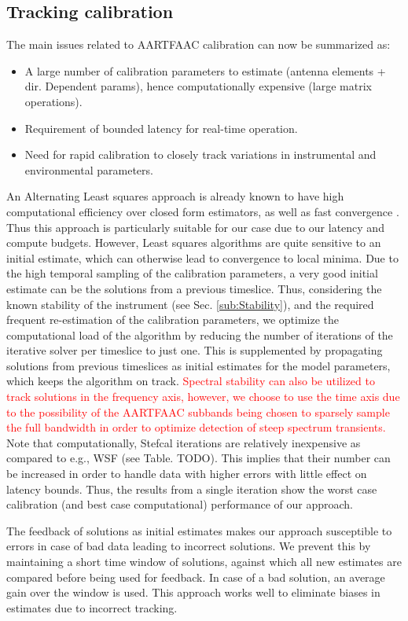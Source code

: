 \documentclass{aa}
\begin{document}
\subsection{Tracking calibration}

The main issues related to AARTFAAC calibration can now be summarized
as:
\begin{itemize}
\item A large number of calibration parameters to estimate (antenna elements
+ dir. Dependent params), hence computationally expensive (large matrix
operations).
\item Requirement of bounded latency for real-time operation. 
\item Need for rapid calibration to closely track variations in instrumental
and environmental parameters.
\end{itemize}
An Alternating Least squares approach is already known to have high
computational efficiency over closed form estimators, as well as fast
convergence \cite{boonstra2003gain}. Thus this approach is particularly
suitable for our case due to our latency and compute budgets. However,
Least squares algorithms are quite sensitive to an initial estimate,
which can otherwise lead to convergence to local minima. Due to the
high temporal sampling of the calibration parameters, a very good
initial estimate can be the solutions from a previous timeslice. Thus,
considering the known stability of the instrument (see Sec. \ref{sub:Stability}),
and the required frequent re-estimation of the calibration parameters,
we optimize the computational load of the algorithm by reducing the
number of iterations of the iterative solver per timeslice to just
one. This is supplemented by propagating solutions from previous timeslices
as initial estimates for the model parameters, which keeps the algorithm
on track. \textcolor{red}{Spectral stability can also be utilized
to track solutions in the frequency axis, however, we choose to use
the time axis due to the possibility of the AARTFAAC subbands being
chosen to sparsely sample the full bandwidth in order to optimize
detection of steep spectrum transients.} Note that computationally,
Stefcal iterations are relatively inexpensive as compared to e.g.,
WSF (see Table. TODO). This implies that their number can be increased
in order to handle data with higher errors with little effect on latency
bounds. Thus, the results from a single iteration show the worst case
calibration (and best case computational) performance of our approach.

The feedback of solutions as initial estimates makes our approach
susceptible to errors in case of bad data leading to incorrect solutions.
We prevent this by maintaining a short time window of solutions, against
which all new estimates are compared before being used for feedback.
In case of a bad solution, an average gain over the window is used.
This approach works well to eliminate biases in estimates due to incorrect
tracking. 
\end{document}
